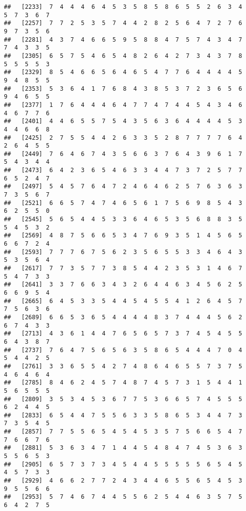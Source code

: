 \documentclass[
]{book}
\begin{document}
\begin{verbatim}
##   [2233]  7  4  4  4  6  4  5  3  5  8  5  8  6  5  5  2  6  3  4  5  7  3  6  7
##   [2257]  7  7  2  5  3  5  7  4  4  2  8  2  5  6  4  7  2  7  6  9  7  3  5  6
##   [2281]  4  3  7  4  6  6  5  9  5  8  8  4  7  5  7  4  3  4  7  7  4  3  3  5
##   [2305]  6  5  7  5  4  6  5  4  8  2  6  4  2  7  3  4  3  7  8  5  5  5  5  3
##   [2329]  8  5  4  6  6  5  6  4  6  5  4  7  7  6  4  4  4  4  5  9  4  8  5  5
##   [2353]  5  3  6  4  1  7  6  8  4  3  8  5  3  7  2  3  6  5  6  9  4  6  5  5
##   [2377]  1  7  6  4  4  4  6  4  7  7  4  7  4  4  5  4  3  4  6  4  6  7  7  6
##   [2401]  4  4  6  5  5  7  5  4  3  5  6  3  6  4  4  4  4  5  3  4  4  6  6  8
##   [2425]  2  7  5  5  4  4  2  6  3  3  5  2  8  7  7  7  7  6  4  2  6  4  5  5
##   [2449]  7  6  4  6  7  4  3  5  6  6  3  7  6  4  3  9  6  1  7  5  4  3  4  4
##   [2473]  6  4  2  3  6  5  4  6  3  3  4  4  7  3  7  2  5  7  7  6  5  2  4  7
##   [2497]  5  4  5  7  6  4  7  2  4  6  4  6  2  5  7  6  3  6  3  7  3  5  6  7
##   [2521]  6  6  5  7  4  7  4  6  5  6  1  7  5  6  9  8  5  4  3  6  2  5  5  0
##   [2545]  5  6  5  4  4  5  3  3  6  4  6  5  3  5  6  8  8  3  5  5  4  5  3  2
##   [2569]  4  8  7  5  6  6  5  3  4  7  6  9  3  5  1  4  5  6  5  6  6  7  2  4
##   [2593]  7  7  7  6  7  5  6  2  3  5  6  5  5  3  3  4  6  4  3  5  3  5  6  4
##   [2617]  7  7  3  5  7  7  3  8  5  4  4  2  3  5  3  1  4  6  7  5  4  7  3  3
##   [2641]  3  3  7  6  6  3  4  3  2  6  4  4  6  3  4  5  6  2  5  6  6  9  5  4
##   [2665]  6  4  5  3  3  5  4  4  5  4  5  5  4  1  2  6  4  5  7  7  5  6  3  6
##   [2689]  6  6  5  3  6  5  4  4  4  4  8  3  7  4  4  4  5  6  2  6  7  4  3  3
##   [2713]  4  3  6  1  4  4  7  6  5  6  5  7  3  7  4  5  4  5  5  6  4  3  8  7
##   [2737]  7  6  4  7  5  6  5  6  3  5  8  6  5  4  4  4  7  0  4  5  4  4  2  5
##   [2761]  3  3  6  5  5  4  2  7  4  8  6  4  6  5  5  7  3  7  5  4  6  4  6  4
##   [2785]  8  4  6  2  4  5  7  4  8  7  4  5  7  3  1  5  4  4  1  5  6  5  5  5
##   [2809]  3  5  3  4  5  3  6  7  7  5  3  6  6  5  7  4  5  5  5  6  2  4  4  5
##   [2833]  6  5  4  4  7  5  5  6  3  3  5  8  6  5  3  4  4  7  3  7  3  5  4  5
##   [2857]  7  7  5  5  6  5  4  5  4  5  3  5  7  5  6  6  5  4  7  7  6  6  7  6
##   [2881]  5  3  6  3  4  7  1  4  4  5  4  8  4  7  4  5  3  6  3  5  5  6  5  3
##   [2905]  6  5  7  3  7  3  4  5  4  4  5  5  5  5  5  6  5  4  5  4  5  7  3  3
##   [2929]  4  6  6  2  7  7  2  4  3  4  4  6  5  5  6  5  4  5  3  9  5  5  6  6
##   [2953]  5  7  4  6  7  4  4  5  5  6  2  5  4  4  6  3  5  7  5  6  4  2  7  5

\end{verbatim}
\end{document}
